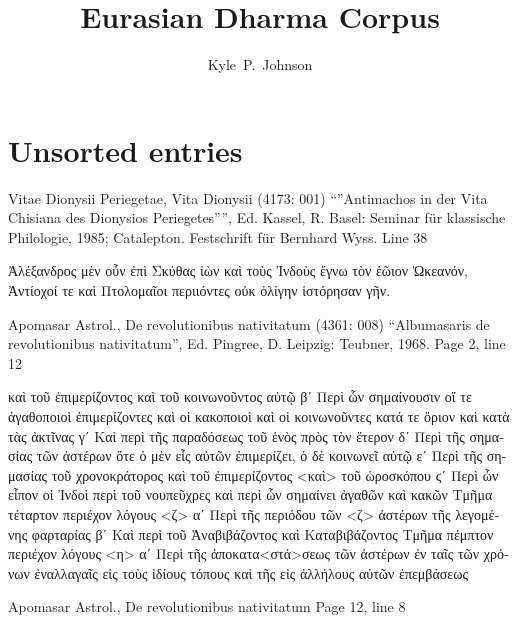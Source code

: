 \documentclass[12pt,letterpaper,twoside,final]{memoir}
\title{Eurasian Dharma Corpus}
\author{Kyle~P.~Johnson}
\begin{document}
\sloppy
{} %
\frontmatter
\hyphenation{}

\SingleSpacing

\dominitoc
\dominilof
\dominilot
\tableofcontents

\mainmatter


\chapter{Unsorted entries}

\begin{greek}

Vitae Dionysii Periegetae, Vita Dionysii (4173: 001)
“”Antimachos in der Vita Chisiana des Dionysios Periegetes””, Ed. Kassel, R.
Basel: Seminar für klassische Philologie, 1985; Catalepton. Festschrift für Bernhard Wyss.
Line 38

                 Ἀλέξανδρος μὲν οὖν ἐπὶ Σκύθας ἰὼν καὶ τοὺς Ἰνδοὺς 
ἔγνω τὸν ἑῶιον Ὠκεανόν, Ἀντίοχοί τε καὶ Πτολομαῖοι περιιόντες 
οὐκ ὀλίγην ἱστόρησαν γῆν. 



Apomasar Astrol., De revolutionibus nativitatum (4361: 008)
“Albumasaris de revolutionibus nativitatum”, Ed. Pingree, D.
Leipzig: Teubner, 1968.
Page 2, line 12

  καὶ τοῦ ἐπιμερίζοντος καὶ τοῦ κοινωνοῦντος αὐτῷ 
 βʹ Περὶ ὧν σημαίνουσιν οἵ τε ἀγαθοποιοὶ ἐπιμερίζοντες 
  καὶ οἱ κακοποιοὶ καὶ οἱ κοινωνοῦντες κατά τε ὅριον 
  καὶ κατὰ τὰς ἀκτῖνας 
 γʹ Καὶ περὶ τῆς παραδόσεως τοῦ ἑνὸς πρὸς τὸν ἕτερον 
 δʹ Περὶ τῆς σημασίας τῶν ἀστέρων ὅτε ὁ μὲν εἷς αὐτῶν 
  ἐπιμερίζει, ὁ δὲ κοινωνεῖ αὐτῷ 
 εʹ Περὶ τῆς σημασίας τοῦ χρονοκράτορος καὶ τοῦ 
  ἐπιμερίζοντος <καὶ> τοῦ ὡροσκόπου 
 ϛʹ Περὶ ὧν εἶπον οἱ Ἰνδοὶ περὶ τοῦ νουπεῦχρες καὶ περὶ 
  ὧν σημαίνει ἀγαθῶν καὶ κακῶν 
Τμῆμα τέταρτον περιέχον λόγους <ζ> 
 αʹ Περὶ τῆς περιόδου τῶν <ζ> ἀστέρων τῆς λεγομένης 
  φαρταρίας 
 βʹ Καὶ περὶ τοῦ Ἀναβιβάζοντος καὶ Καταβιβάζοντος 
Τμῆμα πέμπτον περιέχον λόγους <η> 
 αʹ Περὶ τῆς ἀποκατα<στά>σεως τῶν ἀστέρων ἐν ταῖς 
  τῶν χρόνων ἐναλλαγαῖς εἰς τοὺς ἰδίους τόπους καὶ 
  τῆς εἰς ἀλλήλους αὐτῶν ἐπεμβάσεως 




Apomasar Astrol., De revolutionibus nativitatum 
Page 12, line 8


\end{greek}
\end{document}
